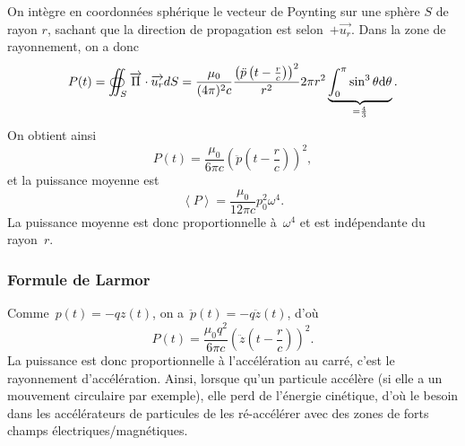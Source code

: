 On intègre en coordonnées sphérique le vecteur de Poynting sur une sphère $S$ de rayon $r$, sachant que la direction de propagation est selon~$+\vec{u_r}$. Dans la zone de rayonnement, on a donc
\begin{equation*}
    P(t)=\oiint_{S}\protect\overrightarrow{{\Pi}}\cdot\protect\overrightarrow{{u_r}}dS=\frac{\mu_0}{(4\pi)^{2}c}\frac{\left(\ddot{p}\left(t-\frac{r}{c}\right)\right)^{2}}{r^{2}}2\pi r^{2}\underbrace{\int_{0}^{\pi}\sin^{3}\theta\mathrm{d}\theta}_{=\frac{4}{3}}.
\end{equation*}
On obtient ainsi
\begin{equation*}
    \boxed{
        P(t)=\frac{\mu_0}{6\pi c}\left(\ddot{p}\left(t-\frac{r}{c}\right)\right)^{2},
    }
\end{equation*}
et la puissance moyenne est 
\begin{equation*}
    \boxed{
        \left\langle P\right\rangle=\frac{\mu_0}{12\pi c}p_{0}^{2}\omega^{4}.
    }
\end{equation*}
La puissance moyenne est donc proportionnelle à~$\omega^{4}$ et est indépendante du rayon~$r$.

\subsubsection{Formule de Larmor}

Comme~$p(t)=-qz(t)$, on a~$\ddot{p}(t)=-q\ddot{z}(t)$, d'où
\begin{equation*}
    \boxed{
        P(t)=\frac{\mu_0 q^{2}}{6\pi c}\left(\ddot{z}\left(t-\frac{r}{c}\right)\right)^{2}.
    }
\end{equation*}
La puissance est donc proportionnelle à l'accélération au carré, c'est le rayonnement d'accélération. Ainsi, lorsque qu'un particule accélère (si elle a un mouvement circulaire par exemple), elle perd de l'énergie cinétique, d'où le besoin dans les accélérateurs de particules de les ré-accélérer avec des zones de forts champs électriques/magnétiques.